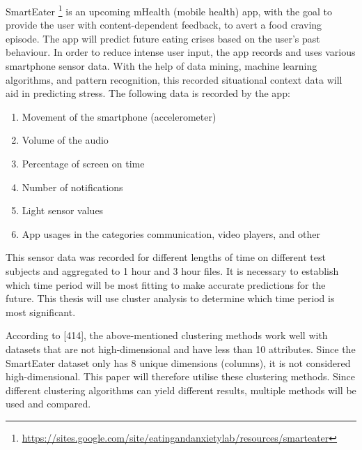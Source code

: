 

SmartEater \footnote{\url{https://sites.google.com/site/eatingandanxietylab/resources/smarteater}} is an upcoming mHealth (mobile health) app, with the goal to provide the user with content-dependent feedback, to avert a food craving episode. The app will predict future eating crises based on the user's past behaviour. In order to reduce intense user input, the app records and uses various smartphone sensor data. With the help of data mining, machine learning algorithms, and pattern recognition, this recorded situational context data will aid in predicting stress. The following data is recorded by the app:

\begin{enumerate}
	\item Movement of the smartphone (accelerometer)
	\item Volume of the audio
	\item Percentage of screen on time
	\item Number of notifications
	\item Light sensor values
	\item App usages in the categories communication, video players, and other
\end{enumerate}



This sensor data was recorded for different lengths of time on different test subjects and aggregated to 1 hour and 3 hour files. It is necessary to establish which time period will be most fitting to make accurate predictions for the future. This thesis will use cluster analysis to determine which time period is most significant.

According to \textcite{han2011data}[414], the above-mentioned clustering methods work well with datasets that are not high-dimensional and have less than 10 attributes. Since the SmartEater dataset only has 8 unique dimensions (columns), it is not considered high-dimensional. This paper will therefore utilise these clustering methods. Since different clustering algorithms can yield different results, multiple methods will be used and compared.

